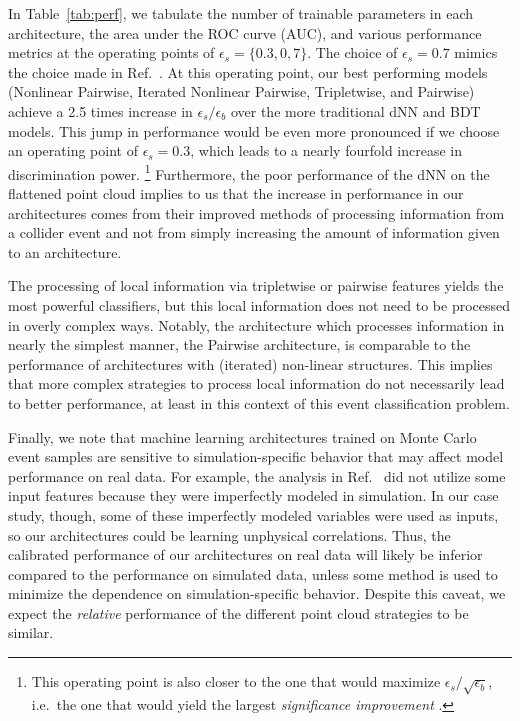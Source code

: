 \documentclass[aps,prd,twocolumn,superscriptaddress,floatfix,longbibliography,preprintnumbers,nofootinbib]{revtex4-1} %
\DeclareRobustCommand{\Tab}[1]{Table~\ref{tab:#1}}
\DeclareRobustCommand{\RRef}[1]{Ref.~\cite{#1}}
\newcommand{\neww}[1]{{{#1}}}
\newcounter{para}
\begin{document}
In \Tab{perf}, we tabulate the number of trainable parameters in each architecture, the area under the ROC curve (AUC), and various performance metrics at the operating points of $\epsilon_s=\{0.3,0,7\}$.
%
The choice of $\epsilon_s=0.7$ mimics the choice made in \RRef{ATLAS:2022yrq}.
%
At this operating point, our \neww{best performing models (Nonlinear Pairwise, Iterated Nonlinear Pairwise, Tripletwise, and Pairwise)} achieve a 2.5 times increase in $\epsilon_s / \epsilon_b$ over the more traditional dNN and BDT models.
%
This jump in performance would be even more pronounced if we choose an operating point of $\epsilon_s=0.3$, which leads to a nearly fourfold increase in discrimination power.%
%
\footnote{This operating point is also closer to the one that would maximize $\epsilon_s/\sqrt{\epsilon_b}$, i.e.\ the one that would yield the largest \emph{significance improvement} \cite{Gallicchio:2012ez}.}
%
Furthermore, the poor performance of the dNN on the flattened point cloud implies to us that the increase in performance in our architectures comes from their improved methods of processing information from a collider event and not from simply increasing the amount of information given to an architecture.


The processing of local information via tripletwise or pairwise features yields the most powerful classifiers, but this local information does not need to be processed in overly complex ways.
%
Notably, the architecture which processes information in nearly the simplest manner, the Pairwise architecture, is comparable to the performance of architectures with (iterated) non-linear structures.
%
This implies that more complex strategies to process local information do not necessarily lead to better performance, at least in this context of this event classification problem. 


Finally, we note that machine learning architectures trained on Monte Carlo event samples are sensitive to simulation-specific behavior that may affect model performance on real data.
%
For example, the analysis in \RRef{ATLAS:2022yrq} did not utilize some input features because they were imperfectly modeled in simulation.
%
In our case study, though, some of these imperfectly modeled variables were used as inputs, so our architectures could be learning unphysical correlations.
%
Thus, the calibrated performance of our architectures on real data will likely be inferior compared to the performance on simulated data, unless some method is used to minimize the dependence on simulation-specific behavior.
%
Despite this caveat, we expect the \emph{relative} performance of the different point cloud strategies to be similar.
\end{document}
